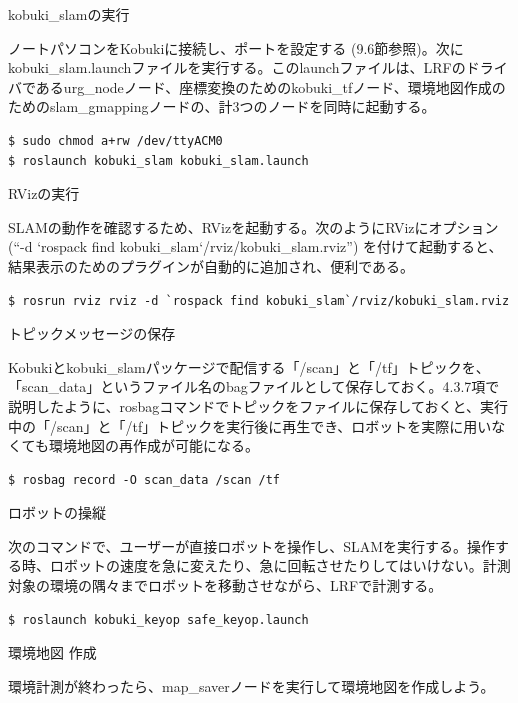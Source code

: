 \circled{\thenum} kobuki\_slamの実行

ノートパソコンをKobukiに接続し、ポートを設定する (9.6節参照)。次にkobuki\_slam.launchファイルを実行する。このlaunchファイルは、LRFのドライバであるurg\_nodeノード、座標変換のためのkobuki\_tfノード、環境地図作成のためのslam\_gmappingノードの、計3つのノードを同時に起動する。

\begin{lstlisting}[language=ROS]
$ sudo chmod a+rw /dev/ttyACM0
$ roslaunch kobuki_slam kobuki_slam.launch
\end{lstlisting}

\circled{\thenum} RVizの実行

SLAMの動作を確認するため、RVizを起動する。次のようにRVizにオプション (“-d `rospack find kobuki\_slam`/rviz/kobuki\_slam.rviz”)  を付けて起動すると、結果表示のためのプラグインが自動的に追加され、便利である。

\begin{lstlisting}[language=ROS]
$ rosrun rviz rviz -d `rospack find kobuki_slam`/rviz/kobuki_slam.rviz
\end{lstlisting}

\circled{\thenum} トピックメッセージの保存

Kobukiとkobuki\_slamパッケージで配信する「/scan」と「/tf」トピックを、「scan\_data」というファイル名のbagファイルとして保存しておく。4.3.7項で説明したように、rosbagコマンドでトピックをファイルに保存しておくと、実行中の「/scan」と「/tf」トピックを実行後に再生でき、ロボットを実際に用いなくても環境地図の再作成が可能になる。

\begin{lstlisting}[language=ROS]
$ rosbag record -O scan_data /scan /tf
\end{lstlisting}

\circled{\thenum} ロボットの操縦

次のコマンドで、ユーザーが直接ロボットを操作し、SLAMを実行する。操作する時、ロボットの速度を急に変えたり、急に回転させたりしてはいけない。計測対象の環境の隅々までロボットを移動させながら、LRFで計測する。

\begin{lstlisting}[language=ROS]
$ roslaunch kobuki_keyop safe_keyop.launch
\end{lstlisting}

\circled{\thenum} 環境地図 作成

環境計測が終わったら、map\_saverノードを実行して環境地図を作成しよう。

